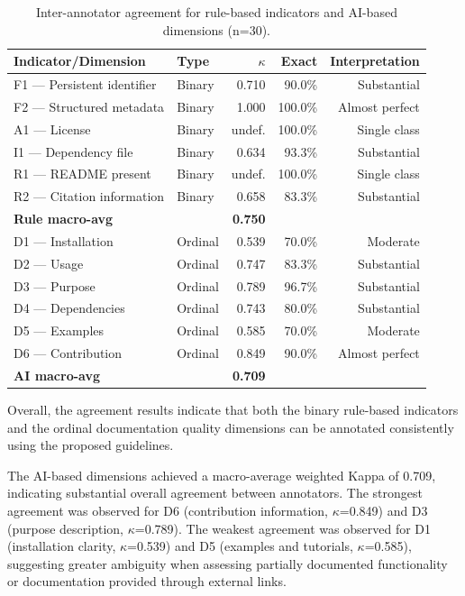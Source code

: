\begin{table}[h]
\centering
\caption{Inter-annotator agreement for rule-based indicators and 
AI-based dimensions (n=30).}
\label{tab:iaa}
\begin{tabular}{llrrr}
\hline
\textbf{Indicator/Dimension} & \textbf{Type} & \textbf{$\kappa$} & 
\textbf{Exact} & \textbf{Interpretation} \\
\hline
F1 --- Persistent identifier & Binary & 0.710 & 90.0\% & Substantial \\
F2 --- Structured metadata   & Binary & 1.000 & 100.0\% & Almost perfect \\
A1 --- License               & Binary & undef. & 100.0\% & Single class \\
I1 --- Dependency file       & Binary & 0.634 & 93.3\% & Substantial \\
R1 --- README present        & Binary & undef. & 100.0\% & Single class \\
R2 --- Citation information  & Binary & 0.658 & 83.3\% & Substantial \\
\hline
\textbf{Rule macro-avg}      & & \textbf{0.750} & & \\
\hline
D1 --- Installation          & Ordinal & 0.539 & 70.0\% & Moderate \\
D2 --- Usage                 & Ordinal & 0.747 & 83.3\% & Substantial \\
D3 --- Purpose               & Ordinal & 0.789 & 96.7\% & Substantial \\
D4 --- Dependencies          & Ordinal & 0.743 & 80.0\% & Substantial \\
D5 --- Examples              & Ordinal & 0.585 & 70.0\% & Moderate \\
D6 --- Contribution          & Ordinal & 0.849 & 90.0\% & Almost perfect \\
\hline
\textbf{AI macro-avg}        & & \textbf{0.709} & & \\
\hline
\end{tabular}
\end{table}

Overall, the agreement results indicate that both the binary 
rule-based indicators and the ordinal documentation quality 
dimensions can be annotated consistently using the proposed 
guidelines.

The AI-based dimensions achieved a macro-average weighted Kappa of 
0.709, indicating substantial overall agreement between annotators. 
The strongest agreement was observed for D6 (contribution 
information, $\kappa$=0.849) and D3 (purpose description, 
$\kappa$=0.789). The weakest agreement was observed for D1 
(installation clarity, $\kappa$=0.539) and D5 (examples and 
tutorials, $\kappa$=0.585), suggesting greater ambiguity when 
assessing partially documented functionality or documentation 
provided through external links.


